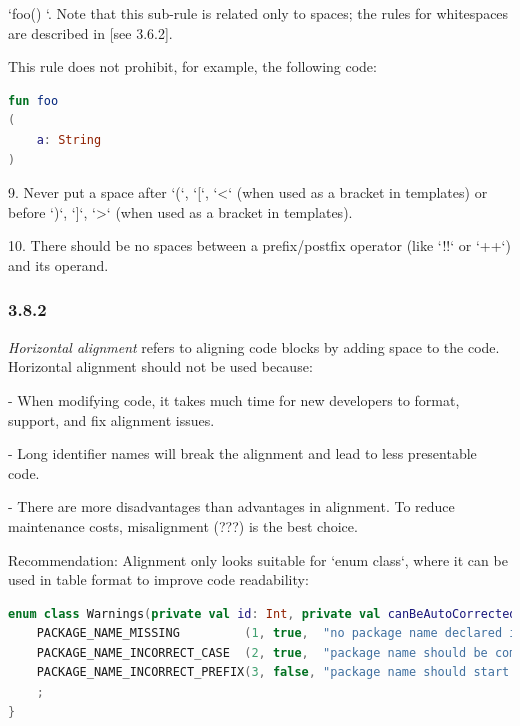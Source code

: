 {{{{   `foo() {}`. Note that this sub-rule is related only to spaces; the rules for whitespaces are described in [see 3.6.2].

    This rule does not prohibit, for example, the following code:

\begin{lstlisting}[language=Kotlin]
fun foo
(
    a: String
)
\end{lstlisting}


9. Never put a space after `(`, `[`, `<` (when used as a bracket in templates) or before `)`, `]`, `>` (when used as a bracket in templates).



10. There should be no spaces between a prefix/postfix operator (like `!!` or `++`) and its operand.



\subsubsection*{\textbf{3.8.2}}
\leavevmode\newline

\label{sec:3.8.2}



\textit{Horizontal alignment} refers to aligning code blocks by adding space to the code. Horizontal alignment should not be used because:



- When modifying code, it takes much time for new developers to format, support, and fix alignment issues.

- Long identifier names will break the alignment and lead to less presentable code.

- There are more disadvantages than advantages in alignment. To reduce maintenance costs, misalignment (???) is the best choice.



Recommendation: Alignment only looks suitable for `enum class`, where it can be used in table format to improve code readability:

\begin{lstlisting}[language=Kotlin]
enum class Warnings(private val id: Int, private val canBeAutoCorrected: Boolean, private val warn: String) : Rule {
    PACKAGE_NAME_MISSING         (1, true,  "no package name declared in a file"),
    PACKAGE_NAME_INCORRECT_CASE  (2, true,  "package name should be completely in a lower case"),
    PACKAGE_NAME_INCORRECT_PREFIX(3, false, "package name should start from the company's domain")
    ;
}
\end{lstlisting}


}}}}
